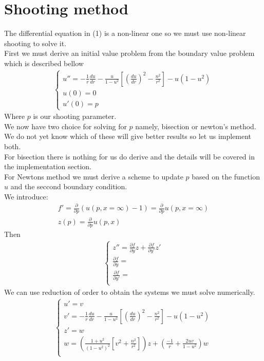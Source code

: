 \documentclass{article}
\begin{document}
\section{Shooting method}
The differential equation in (1) is a non-linear one so we must use non-linear shooting to solve it. \\
First we must derive an initial value problem from the boundary value problem which is described bellow 
\begin{align}
\begin{cases}
u'' = -\frac{1}{r}\frac{du}{dr} - \frac{u}{1-u^2}\left[\left(\frac{du}{dr}\right)^2 - \frac{n^2}{r^2}\right] - u(1-u^2) \\
u(0) = 0 \\
u'(0) = p
\end{cases}
\end{align}
Where $p$ is our shooting parameter. \\
We now have two choice for solving for $p$ namely, bisection or newton's method. 
We do not yet know which of these will give better results so let us implement both.  \\
For bisection there is nothing for us do derive and the details will be covered in the implementation section. \\
For Newtons method we must derive a scheme to update $p$ based on the function $u$ and the seccond boundary condition.\\ 
We introduce:
\begin{align}
f' = \frac{\partial }{\partial p}\left(u(p,x=\infty)-1\right) =  \frac{\partial }{\partial p} u(p,x=\infty) \\
z(p) = \frac{\partial }{\partial p} u(p,x)
\end{align}
Then 
\begin{align}
\begin{cases}
z'' = \frac{\partial f}{\partial y}z + \frac{\partial f}{\partial y'}z' \\
 \frac{\partial f}{\partial y} = \\
 \frac{\partial f}{\partial y'} = \\
\end{cases}
\end{align}
We can use reduction of order to obtain the systems we must solve numerically. 
\begin{align}
\begin{cases}
u' = v \\
v' = -\frac{1}{r}\frac{du}{dr} - \frac{u}{1-u^2}\left[\left(\frac{du}{dr}\right)^2 - \frac{n^2}{r^2}\right] - u(1-u^2) \\
z' = w \\
w = \left(\frac{1+u^2}{(1-u^2)^2}\left[ v^2 + \frac{n^2}{r^2} \right] \right)z + \left(\frac{-1}{r} + \frac{2uv}{1-u^2}\right)w \\
\end{cases}
\end{align}
\end{document}

